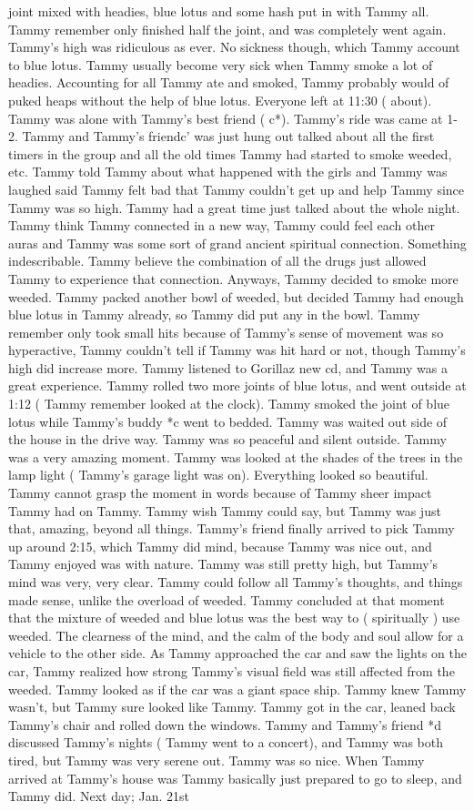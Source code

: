 \documentclass[12pt]{book}
\begin{document}
joint mixed with headies, blue lotus and some hash put in with Tammy all. Tammy remember only finished half the joint, and was completely went again. Tammy's high was ridiculous as ever. No sickness though, which Tammy account to blue lotus. Tammy usually become very sick when Tammy smoke a lot of headies. Accounting for all Tammy ate and smoked, Tammy probably would of puked heaps without the help of blue lotus. Everyone left at 11:30 ( about). Tammy was alone with Tammy's best friend ( c*). Tammy's ride was came at 1-2. Tammy and Tammy's friendc' was just hung out talked about all the first timers in the group and all the old times Tammy had started to smoke weeded, etc. Tammy told Tammy about what happened with the girls and Tammy was laughed said Tammy felt bad that Tammy couldn't get up and help Tammy since Tammy was so high. Tammy had a great time just talked about the whole night. Tammy think Tammy connected in a new way, Tammy could feel each other auras and Tammy was some sort of grand ancient spiritual connection. Something indescribable. Tammy believe the combination of all the drugs just allowed Tammy to experience that connection. Anyways, Tammy decided to smoke more weeded. Tammy packed another bowl of weeded, but decided Tammy had enough blue lotus in Tammy already, so Tammy did put any in the bowl. Tammy remember only took small hits because of Tammy's sense of movement was so hyperactive, Tammy couldn't tell if Tammy was hit hard or not, though Tammy's high did increase more. Tammy listened to Gorillaz new cd, and Tammy was a great experience. Tammy rolled two more joints of blue lotus, and went outside at 1:12 ( Tammy remember looked at the clock). Tammy smoked the joint of blue lotus while Tammy's buddy *c went to bedded. Tammy was waited out side of the house in the drive way. Tammy was so peaceful and silent outside. Tammy was a very amazing moment. Tammy was looked at the shades of the trees in the lamp light ( Tammy's garage light was on). Everything looked so beautiful. Tammy cannot grasp the moment in words because of Tammy sheer impact Tammy had on Tammy. Tammy wish Tammy could say, but Tammy was just that, amazing, beyond all things. Tammy's friend finally arrived to pick Tammy up around 2:15, which Tammy did mind, because Tammy was nice out, and Tammy enjoyed was with nature. Tammy was still pretty high, but Tammy's mind was very, very clear. Tammy could follow all Tammy's thoughts, and things made sense, unlike the overload of weeded. Tammy concluded at that moment that the mixture of weeded and blue lotus was the best way to ( spiritually ) use weeded. The clearness of the mind, and the calm of the body and soul allow for a vehicle to the other side. As Tammy approached the car and saw the lights on the car, Tammy realized how strong Tammy's visual field was still affected from the weeded. Tammy looked as if the car was a giant space ship. Tammy knew Tammy wasn't, but Tammy sure looked like Tammy. Tammy got in the car, leaned back Tammy's chair and rolled down the windows. Tammy and Tammy's friend *d discussed Tammy's nights ( Tammy went to a concert), and Tammy was both tired, but Tammy was very serene out. Tammy was so nice. When Tammy arrived at Tammy's house was Tammy basically just prepared to go to sleep, and Tammy did. Next day; Jan. 21st 
\end{document}
